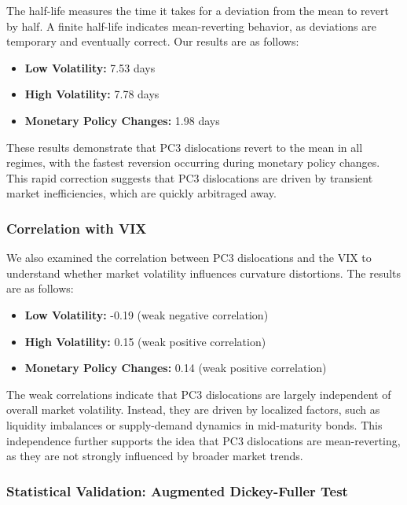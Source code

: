 \documentclass[12pt]{article}
\begin{document}
The half-life measures the time it takes for a deviation from the mean to revert by half. A finite half-life indicates mean-reverting behavior, as deviations are temporary and eventually correct. Our results are as follows:

\begin{itemize}
    \item \textbf{Low Volatility:} 7.53 days
    \item \textbf{High Volatility:} 7.78 days
    \item \textbf{Monetary Policy Changes:} 1.98 days
\end{itemize}

These results demonstrate that PC3 dislocations revert to the mean in all regimes, with the fastest reversion occurring during monetary policy changes. This rapid correction suggests that PC3 dislocations are driven by transient market inefficiencies, which are quickly arbitraged away.

\subsubsection{Correlation with VIX}

We also examined the correlation between PC3 dislocations and the VIX to understand whether market volatility influences curvature distortions. The results are as follows:

\begin{itemize}
    \item \textbf{Low Volatility:} -0.19 (weak negative correlation)
    \item \textbf{High Volatility:} 0.15 (weak positive correlation)
    \item \textbf{Monetary Policy Changes:} 0.14 (weak positive correlation)
\end{itemize}

The weak correlations indicate that PC3 dislocations are largely independent of overall market volatility. Instead, they are driven by localized factors, such as liquidity imbalances or supply-demand dynamics in mid-maturity bonds. This independence further supports the idea that PC3 dislocations are mean-reverting, as they are not strongly influenced by broader market trends.

\subsubsection{Statistical Validation: Augmented Dickey-Fuller Test}
\end{document}
